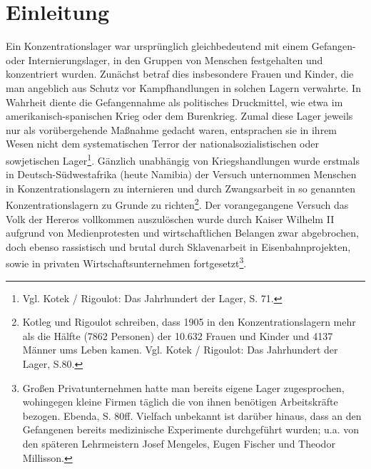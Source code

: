 \section*{Einleitung}
%
Ein Konzentrationslager war ursprünglich gleichbedeutend mit einem Gefangen- oder Internierungslager, in den Gruppen von Menschen festgehalten und konzentriert wurden. 
Zunächst betraf dies insbesondere Frauen und Kinder, die man angeblich aus Schutz vor Kampfhandlungen in solchen Lagern verwahrte. In Wahrheit diente die Gefangennahme als politisches Druckmittel, wie etwa im amerikanisch-spanischen Krieg oder dem Burenkrieg. Zumal diese Lager jeweils nur als vorübergehende Maßnahme gedacht waren, entsprachen sie in ihrem Wesen nicht dem systematischen Terror der nationalsozialistischen oder sowjetischen Lager\footnote{Vgl. Kotek / Rigoulot: Das Jahrhundert der Lager, S. 71.}. Gänzlich unabhängig von Kriegshandlungen wurde erstmals in Deutsch-Südwestafrika (heute Namibia) der Versuch unternommen Menschen in Konzentrationslagern zu internieren und durch Zwangsarbeit in so genannten Konzentrationslagern zu Grunde zu richten\footnote{Kotleg und Rigoulot schreiben, dass 1905 in den Konzentrationslagern mehr als die Hälfte (7862 Personen) der 10.632 Frauen und Kinder und 4137 Männer ums Leben kamen. Vgl. Kotek / Rigoulot: Das Jahrhundert der Lager, S.80.}. Der vorangegangene Versuch das Volk der Hereros vollkommen auszulöschen wurde durch Kaiser Wilhelm II aufgrund von Medienprotesten und wirtschaftlichen Belangen zwar abgebrochen, doch ebenso rassistisch und brutal durch Sklavenarbeit in Eisenbahnprojekten, sowie in privaten Wirtschaftsunternehmen fortgesetzt\footnote{Großen Privatunternehmen hatte man bereits eigene Lager zugesprochen, wohingegen kleine Firmen täglich die von ihnen benötigen Arbeitskräfte bezogen. Ebenda, S. 80ff. Vielfach unbekannt ist darüber hinaus, dass an den Gefangenen bereits medizinische Experimente durchgeführt wurden; u.a. von den späteren Lehrmeistern Josef Mengeles, Eugen Fischer und Theodor Millisson.}.


